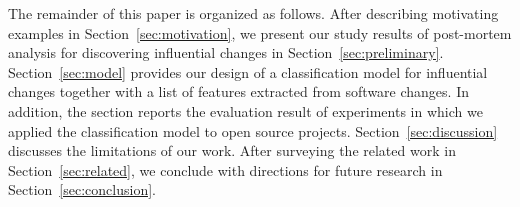 The remainder of this paper is organized as follows. After describing motivating
examples in Section~\ref{sec:motivation}, we present our study results of
post-mortem analysis for discovering influential changes in
Section~\ref{sec:preliminary}.
Section~\ref{sec:model} provides our design of a classification model for
influential changes together with a list of features extracted from software changes.
In addition, the section reports the evaluation result of experiments in which
we applied the classification model to open source projects.
Section~\ref{sec:discussion} discusses the limitations of our work.
After surveying the related work in Section~\ref{sec:related}, 
we conclude with directions for future research in
Section~\ref{sec:conclusion}.
